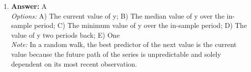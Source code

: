\documentclass[12pt]{article}
\begin{document}
\begin{enumerate}[label=\arabic*.]
\\ \textit{Note:} A prolonged period of very bad weather can disrupt agricultural production and supply chains, leading to higher prices (inflation) and reduced output (lower real GDP), which aligns with the scenario of increased price levels and decreased real GDP in the short run.
\item \textbf{Answer:} A
\\ \textit{Options:} A) The current value of y; B) The median value of y over the in-sample period; C) The minimum value of y over the in-sample period; D) The value of y two periods back; E) One
\\ \textit{Note:} In a random walk, the best predictor of the next value is the current value because the future path of the series is unpredictable and solely dependent on its most recent observation.
\end{enumerate}
\end{document}
